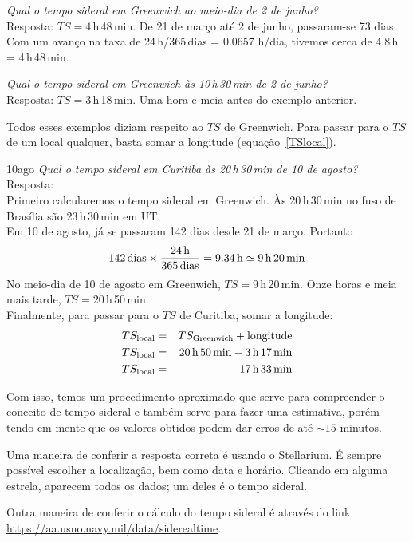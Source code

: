 \begin{exemplo}{6}
\textit{Qual o tempo sideral em Greenwich ao meio-dia de 2 de junho?}\\

Resposta: $TS = 4$\,h\,48\,min. De 21 de março até 2 de junho, passaram-se 73 dias. Com um avanço na taxa de 24\,h/365\,dias = 0.0657 h/dia, tivemos cerca de 4.8\,h = 4\,h\,48\,min.
\end{exemplo}

\begin{exemplo}{7}
\textit{Qual o tempo sideral em Greenwich às 10\,h\,30\,min de 2 de junho?}\\

Resposta: $TS = 3$\,h\,18\,min. Uma hora e meia antes do exemplo anterior.
\end{exemplo}

Todos esses exemplos diziam respeito ao $TS$ de Greenwich. Para passar para o $TS$ de um local qualquer, basta somar a longitude (equação~\ref{TSlocal}).\\

\begin{exemplo}{10ago}
\textit{Qual o tempo sideral em Curitiba às 20\,h\,30\,min de 10 de agosto?}\\

Resposta:\\

Primeiro calcularemos o tempo sideral em Greenwich. Às 20\,h\,30\,min no fuso de Brasília são 23\,h\,30\,min em UT.\\

Em 10 de agosto, já se passaram 142 dias desde 21 de março. Portanto
\[
142\,\text{dias} \times \frac{24\,{\rm h}}{365\,{\rm dias}} = 9.34\,{\rm h} \simeq 9\,{\rm h}\,20\,{\rm min}  
\]
No meio-dia de 10 de agosto em Greenwich, $TS=9$\,h\,20\,min. Onze horas e meia mais tarde, $TS=20$\,h\,50\,min.\\

Finalmente, para passar para o $TS$ de Curitiba, somar a longitude:
\begin{eqnarray*}
TS_{\rm local} &=& TS_{\rm Greenwich} + \text{longitude}\\
TS_{\rm local} &=& 20\,{\rm h}\,50\,{\rm min} - 3\,{\rm h}\,17\,{\rm min} \\
TS_{\rm local} &=&  17\,{\rm h}\,33\,{\rm min}
\end{eqnarray*}

\end{exemplo}

Com isso, temos um procedimento aproximado que serve para compreender o conceito de tempo sideral e também serve para fazer uma estimativa, porém tendo em mente que os valores obtidos podem dar erros de até ${\sim}15$ minutos.

Uma maneira de conferir a resposta correta é usando o Stellarium. É sempre possível escolher a localização, bem como data e horário. Clicando em alguma estrela, aparecem todos os dados; um deles é o tempo sideral.
 
Outra maneira de conferir o cálculo do tempo sideral é através do link \url{https://aa.usno.navy.mil/data/siderealtime}.


